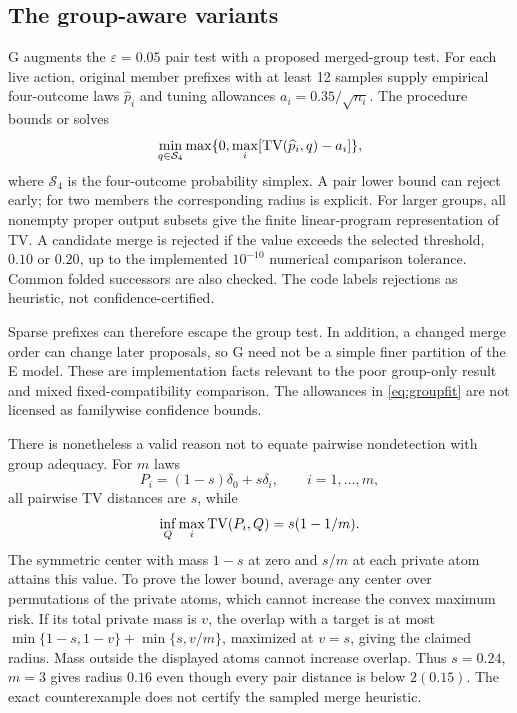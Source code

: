 \subsection{The group-aware variants}\label{app:group}
G augments the $\varepsilon=0.05$ pair test with a proposed merged-group test. For each live action, original member prefixes with at least 12 samples supply empirical four-outcome laws $\widehat p_i$ and tuning allowances $a_i=0.35/\sqrt{n_i}$. The procedure bounds or solves
\begin{equation}\label{eq:groupfit}
 \min_{q\in\mathcal S_4}\max\{0,\max_i[\operatorname{TV}(\widehat p_i,q)-a_i]\},
\end{equation}
where $\mathcal S_4$ is the four-outcome probability simplex. A pair lower bound can reject early; for two members the corresponding radius is explicit. For larger groups, all nonempty proper output subsets give the finite linear-program representation of TV. A candidate merge is rejected if the value exceeds the selected threshold, $0.10$ or $0.20$, up to the implemented $10^{-10}$ numerical comparison tolerance. Common folded successors are also checked. The code labels rejections as heuristic, not confidence-certified.

Sparse prefixes can therefore escape the group test. In addition, a changed merge order can change later proposals, so G need not be a simple finer partition of the E model. These are implementation facts relevant to the poor group-only result and mixed fixed-compatibility comparison. The allowances in \cref{eq:groupfit} are not licensed as familywise confidence bounds.

There is nonetheless a valid reason not to equate pairwise nondetection with group adequacy. For $m$ laws
\begin{equation}
 P_i=(1-s)\delta_0+s\delta_i,\qquad i=1,\ldots,m,
\end{equation}
all pairwise TV distances are $s$, while
\begin{equation}\label{eq:group-radius}
 \inf_Q\max_i\operatorname{TV}(P_i,Q)=s(1-1/m).
\end{equation}
The symmetric center with mass $1-s$ at zero and $s/m$ at each private atom attains this value. To prove the lower bound, average any center over permutations of the private atoms, which cannot increase the convex maximum risk. If its total private mass is $v$, the overlap with a target is at most
$\min\{1-s,1-v\}+\min\{s,v/m\}$, maximized at $v=s$, giving the claimed radius. Mass outside the displayed atoms cannot increase overlap. Thus $s=0.24$, $m=3$ gives radius $0.16$ even though every pair distance is below $2(0.15)$. The exact counterexample does not certify the sampled merge heuristic.

